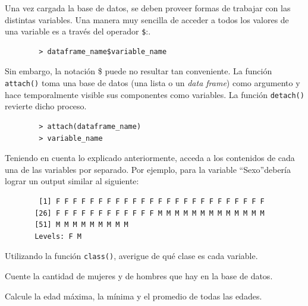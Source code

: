 \documentclass{prob}
\begin{document}
    \begin{problema}
	Una vez cargada la base de datos, se deben proveer formas de trabajar con las distintas variables. Una manera muy sencilla de acceder a todos los valores de una variable es a través del operador \texttt{\$}:.
	\begin{verbatim}
	    > dataframe_name$variable_name	
	\end{verbatim}
Sin embargo, la notación \$ puede no resultar tan conveniente. La función \texttt{attach()} toma una base de datos (una lista o un  \textit{data frame}) como argumento y hace temporalmente visible sus componentes como variables. La función \texttt{detach()} revierte dicho proceso.
	\begin{verbatim}
	    > attach(dataframe_name)
	    > variable_name	
	\end{verbatim}        	

	\begin{parte}
    	Teniendo en cuenta lo explicado anteriormente, acceda a los contenidos de cada una de las variables por separado. Por ejemplo, para la variable \textquotedblleft Sexo\textquotedblright debería lograr un output similar al siguiente:
    	\begin{verbatim}
        [1] F F F F F F F F F F F F F F F F F F F F F F F F F
       [26] F F F F F F F F F F F F M M M M M M M M M M M M M
       [51] M M M M M M M M M
       Levels: F M
    	\end{verbatim}
    \end{parte}

	\begin{parte}
		Utilizando la función \texttt{class()}, averigue de qué clase es cada variable.   
    \end{parte}

	\begin{parte}
		Cuente la cantidad de mujeres y de hombres que hay en la base de datos.\\
		
	\noindent{}	
		
    \end{parte}
    
	\begin{parte}
		Calcule la edad máxima, la mínima y el promedio de todas las edades.\\
			
\noindent{}			

    \end{parte}    
    \end{problema}
 
\end{document}
